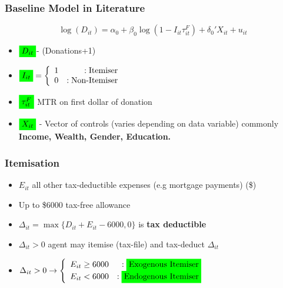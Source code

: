\documentclass[options]{beamer}
\newcommand{\highlight}[1]{\colorbox{green}{\ensuremath{#1}}}
\begin{document}
	
	\begin{frame}
		\frametitle{Baseline Model in Literature}
	
	\begin{equation*}
\log(D_{it})= \alpha_0 +\beta_0\log (1-I_{it}\tau _{it}^F) +\delta_0'X_{it}+ u_{it} 
	\end{equation*}		
					\begin{itemize}
	\item[] $\highlight{D_{it}}$- (Donations+1)
	\vspace{9pt}
	 \item[] $\highlight{I_{it}} = \left\{
	\begin{array}{lr}
	1& : \textrm{Itemiser}\\
	0 & :  \textrm{Non-Itemiser}
	\end{array}
	\right.
$
\vspace{5pt}

\item[] $\highlight{\tau_{it}^F }$ MTR on first dollar of donation

\vspace{5pt}
\item[] 	$\highlight{X_{it}}$ - Vector of controls (varies depending on data variable) commonly \textbf{Income, Wealth, Gender, Education.}
	
	
		\end{itemize}\end{frame}
			
				
		\begin{frame}
	\frametitle{Itemisation}
\begin{itemize}
\item $E_{it}$ all other tax-deductible expenses (e.g mortgage payments) (\$)
\vspace{15pt}
\item  Up to \$6000	tax-free allowance
\vspace{15pt}
\item  $\Delta_{it}=\max\{D_{it}+E_{it}-6000,0\}$ is \textbf{tax deductible }
\vspace{15pt}
\item  $\Delta_{it}>0$ agent may itemise (tax-file) and tax-deduct $\Delta_{it}$
		\vspace{15pt}
		\item[]	
			$\Delta_{it}>0 \rightarrow  \left\{
			\begin{array}{lr}
			E_{it}\geq 6000& : \highlight{\textrm{Exogenous Itemiser}}\\
			 	E_{it}<6000& : \highlight{ \textrm{Endogenous Itemiser}}
			\end{array}
			\right.$

	\end{itemize}\end{frame}	
	
\end{document}
